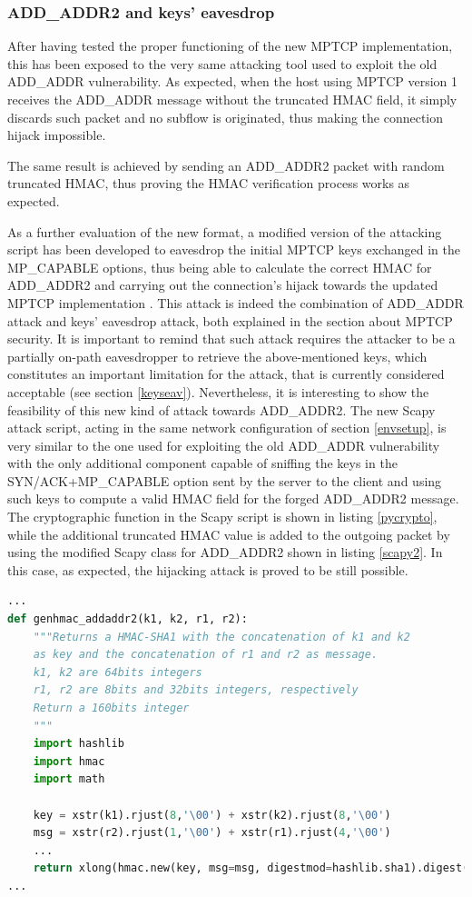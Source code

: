 \subsubsection{ADD\_ADDR2 and keys' eavesdrop}
After having tested the proper functioning of the new MPTCP implementation, this has been exposed to the very same attacking tool used to exploit the old ADD\_ADDR vulnerability. As expected, when the host using MPTCP version 1 receives the ADD\_ADDR message without the truncated HMAC field, it simply discards such packet and no subflow is originated, thus making the connection hijack impossible.

The same result is achieved by sending an ADD\_ADDR2 packet with random truncated HMAC, thus proving the HMAC verification process works as expected.

As a further evaluation of the new format, a modified version of the attacking script has been developed to eavesdrop the initial MPTCP keys exchanged in the MP\_CAPABLE options, thus being able to calculate the correct HMAC for ADD\_ADDR2 and carrying out the connection's hijack towards the updated MPTCP implementation \cite{add-addr2-eav}. This attack is indeed the combination of ADD\_ADDR attack and keys' eavesdrop attack, both explained in the section about MPTCP security.
It is important to remind that such attack requires the attacker to be a partially on-path eavesdropper to retrieve the above-mentioned keys, which constitutes an important limitation for the attack, that is currently considered acceptable (see section \ref{keyseav}). Nevertheless, it is interesting to show the feasibility of this new kind of attack towards ADD\_ADDR2. The new Scapy attack script, acting in the same network configuration of section \ref{envsetup}, is very similar to the one used for exploiting the old ADD\_ADDR vulnerability with the only additional component capable of sniffing the keys in the SYN/ACK+MP\_CAPABLE option sent by the server to the client and using such keys to compute a valid HMAC field for the forged ADD\_ADDR2 message. The cryptographic function in the Scapy script is shown in listing \ref{pycrypto}, while the additional truncated HMAC value is added to the outgoing packet by using the modified Scapy class for ADD\_ADDR2 shown in listing \ref{scapy2}. In this case, as expected, the hijacking attack is proved to be still possible.

\begin{lstlisting}[language=Python, caption=\textit{HMAC calculation in Python}, label=pycrypto]
...
def genhmac_addaddr2(k1, k2, r1, r2):
    """Returns a HMAC-SHA1 with the concatenation of k1 and k2
    as key and the concatenation of r1 and r2 as message.
    k1, k2 are 64bits integers
    r1, r2 are 8bits and 32bits integers, respectively
    Return a 160bits integer
    """
    import hashlib
    import hmac
    import math

    key = xstr(k1).rjust(8,'\00') + xstr(k2).rjust(8,'\00')
    msg = xstr(r2).rjust(1,'\00') + xstr(r1).rjust(4,'\00')
    ...
    return xlong(hmac.new(key, msg=msg, digestmod=hashlib.sha1).digest())
...
\end{lstlisting}

